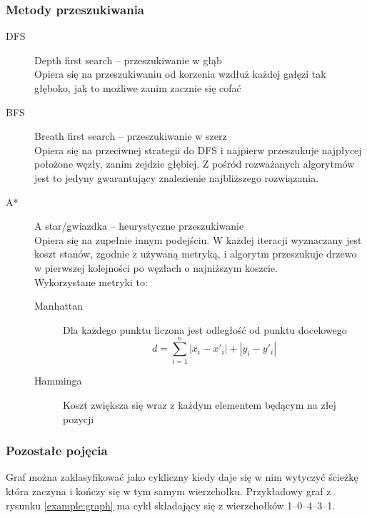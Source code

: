 \documentclass{classrep}
\begin{document}
\subsubsection{Metody przeszukiwania}
\begin{description}
    \item [DFS] Depth first search -- przeszukiwanie w głąb\\ 
    Opiera się na przeszukiwaniu od korzenia wzdłuż każdej gałęzi tak głęboko, jak to możliwe zanim zacznie się cofać
    \item [BFS] Breath first search -- przeszukiwanie w szerz\\
    Opiera się na przeciwnej strategii do DFS i najpierw przeszukuje najpłycej położone węzły, zanim zejdzie głębiej.
    Z pośród rozważanych algorytmów jest to jedyny gwarantujący znalezienie najbliższego rozwiązania.
    \item [A*]  A star/gwiazdka -- heurystyczne przeszukiwanie\\
    Opiera się na zupełnie innym podejściu.
    W każdej iteracji wyznaczany jest koszt stanów, zgodnie z używaną metryką, i algorytm przeszukuje drzewo w pierwszej kolejności po węzłach o najniższym koszcie.
    \\
    Wykorzystane metryki to:
    \begin{description}
        \item [Manhattan] Dla każdego punktu liczona jest odległość od punktu docelowego
        \[d=\sum_{i=1}^{n} |x_i-x'_i|+|y_i-y'_i|\] 
        \item [Hamminga] Koszt zwiększa się wraz z każdym elementem będącym na złej pozycji
    \end{description}
\end{description}

\subsubsection{Pozostałe pojęcia}
\begin{description}
    \item [Cykliczność]
    Graf można zaklasyfikować jako cykliczny kiedy daje się w nim wytyczyć ścieżkę która zaczyna i kończy się w tym samym wierzchołku\cite{AlgDataStrucure}.
    Przykładowy graf z rysunku \ref{example:graph} ma cykl składający się z wierzchołków  1--0--4--3--1.
    \item [Droga]
    \item 
\end{description}
\end{document}
